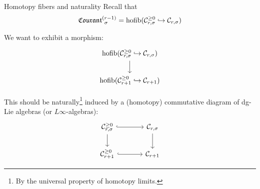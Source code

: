\documentclass[beamer,10pt]{standalone}
\begin{document}
\begin{frame}{Homotopy fibers and naturality}
	Recall that $$\Courant[\sigma]{r-1} = \hofib(\mathcal{C}_{r,\sigma}^{\geq 0} \hookrightarrow \mathcal{C}_{r,\sigma}) $$
	\pause
	\vfill

	We want to exhibit a morphism:
		\begin{displaymath}
			\begin{tikzcd}[ampersand replacement=\&]
				\hofib(\mathcal{C}_{r,\sigma}^{\geq 0} \hookrightarrow \mathcal{C}_{r,\sigma}) \ar[d]
				\\
				\hofib(\mathcal{C}_{r+1}^{\geq 0} \hookrightarrow \mathcal{C}_{r+1})
			\end{tikzcd}
		\end{displaymath}
	\pause
	\vfill

	This should be naturally\footnote{By the universal property of homotopy limits.} induced by a (homotopy) commutative diagram of dg-Lie algebras (or $L\infty$-algebras):
		\begin{displaymath}
			\begin{tikzcd}[ampersand replacement=\&,column sep = large]
				\mathcal{C}_{r,\sigma}^{\geq 0} \ar[r,hook] \ar[d ]
				\& \mathcal{C}_{r,\sigma} \ar[d, ]
				\\
				\mathcal{C}_{r+1}^{\geq 0} \ar[r,hook] \& \mathcal{C}_{r+1} 
			\end{tikzcd}
		\end{displaymath}
	
\end{frame}
\note[itemize]
{
	\item 
	\item 
}
\end{document}
